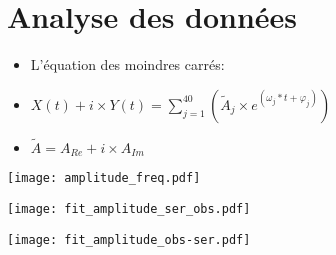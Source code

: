 \section{Analyse des données}

\begin{frame}
	\begin{itemize}
	  \item L'équation des moindres carrés:
      \item $X(t) + i \times Y(t) = \sum\limits_{j=1}^{40} (\widetilde{A}_{j} \times e^{(\omega_{j}*t + \varphi_{j})})$
      \item $\widetilde{A} = A_{Re} + i \times A_{Im}$
	\end{itemize}
\end{frame}

\begin{frame}
	\begin{center}
		\texttt{[image: amplitude\_freq.pdf]}
	\end{center}
\end{frame}

\begin{frame}
	\begin{center}
		\texttt{[image: fit\_amplitude\_ser\_obs.pdf]}
	\end{center}
\end{frame}

\begin{frame}
	\begin{center}
		\texttt{[image: fit\_amplitude\_obs-ser.pdf]}
	\end{center}
\end{frame}